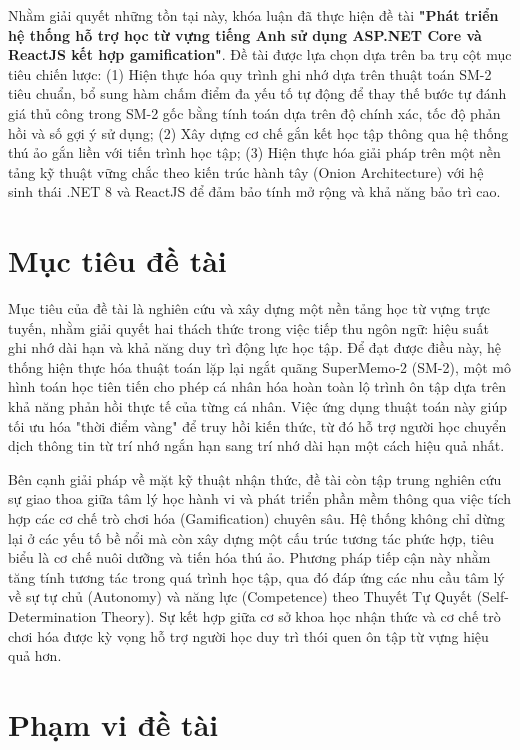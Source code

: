 Nhằm giải quyết những tồn tại này, khóa luận đã thực hiện đề tài \textbf{"Phát triển hệ thống hỗ trợ học từ vựng tiếng Anh sử dụng ASP.NET Core và ReactJS kết hợp gamification"}. Đề tài được lựa chọn dựa trên ba trụ cột mục tiêu chiến lược: 
(1) Hiện thực hóa quy trình ghi nhớ dựa trên thuật toán SM-2 tiêu chuẩn, bổ sung hàm chấm điểm đa yếu tố tự động để thay thế bước tự đánh giá thủ công trong SM-2 gốc bằng tính toán dựa trên độ chính xác, tốc độ phản hồi và số gợi ý sử dụng; 
(2) Xây dựng cơ chế gắn kết học tập thông qua hệ thống thú ảo gắn liền với tiến trình học tập; 
(3) Hiện thực hóa giải pháp trên một nền tảng kỹ thuật vững chắc theo kiến trúc hành tây (Onion Architecture) với hệ sinh thái .NET 8 và ReactJS để đảm bảo tính mở rộng và khả năng bảo trì cao.

\section{Mục tiêu đề tài}
Mục tiêu của đề tài là nghiên cứu và xây dựng một nền tảng học từ vựng trực tuyến, nhằm giải quyết hai thách thức trong việc tiếp thu ngôn ngữ: hiệu suất ghi nhớ dài hạn và khả năng duy trì động lực học tập. Để đạt được điều này, hệ thống hiện thực hóa thuật toán lặp lại ngắt quãng SuperMemo-2 (SM-2), một mô hình toán học tiên tiến cho phép cá nhân hóa hoàn toàn lộ trình ôn tập dựa trên khả năng phản hồi thực tế của từng cá nhân. Việc ứng dụng thuật toán này giúp tối ưu hóa "thời điểm vàng" để truy hồi kiến thức, từ đó hỗ trợ người học chuyển dịch thông tin từ trí nhớ ngắn hạn sang trí nhớ dài hạn một cách hiệu quả nhất.

Bên cạnh giải pháp về mặt kỹ thuật nhận thức, đề tài còn tập trung nghiên cứu sự giao thoa giữa tâm lý học hành vi và phát triển phần mềm thông qua việc tích hợp các cơ chế trò chơi hóa (Gamification) chuyên sâu. Hệ thống không chỉ dừng lại ở các yếu tố bề nổi mà còn xây dựng một cấu trúc tương tác phức hợp, tiêu biểu là cơ chế nuôi dưỡng và tiến hóa thú ảo. Phương pháp tiếp cận này nhằm tăng tính tương tác trong quá trình học tập, qua đó đáp ứng các nhu cầu tâm lý về sự tự chủ (Autonomy) và năng lực (Competence) theo Thuyết Tự Quyết (Self-Determination Theory). Sự kết hợp giữa cơ sở khoa học nhận thức và cơ chế trò chơi hóa được kỳ vọng hỗ trợ người học duy trì thói quen ôn tập từ vựng hiệu quả hơn.

\section{Phạm vi đề tài}

